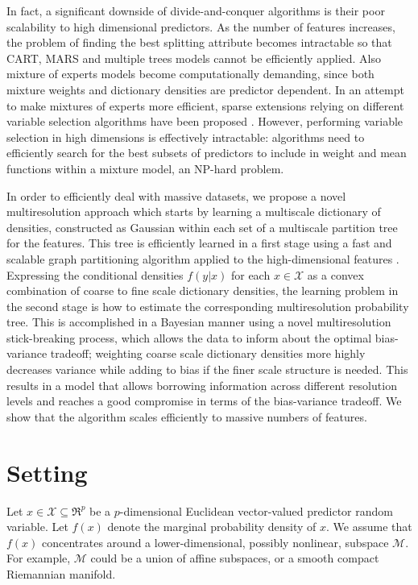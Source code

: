 \documentclass{article} %
\providecommand{\mc}[1]{\mathcal{#1}}
\begin{document}
In fact, a significant downside of divide-and-conquer algorithms is their poor scalability to high dimensional predictors. As the number of features increases, the problem of finding the best splitting attribute becomes intractable so that CART, MARS and multiple trees models cannot be efficiently applied. Also mixture of experts models become computationally demanding, since both mixture weights and dictionary densities are predictor dependent. In an attempt to make mixtures of experts more efficient, sparse extensions relying on different variable selection algorithms have been proposed \cite{SparseMoF}. However, performing variable selection in high dimensions is effectively intractable: algorithms need to efficiently search for the best subsets of predictors to include in weight and mean functions within a mixture model, an NP-hard problem.

 In order to efficiently deal with massive datasets, we propose a novel multiresolution approach which starts by learning a multiscale dictionary of densities, constructed as Gaussian within each set of a multiscale partition tree for the features. This tree is efficiently learned in a first stage using a fast and scalable graph partitioning algorithm applied to the high-dimensional features \cite{metis}.  Expressing the conditional densities $f(y|x)$ for each $x \in \mathcal{X}$ as a convex combination of coarse to fine scale dictionary densities, the learning problem in the second stage is how to estimate the corresponding multiresolution probability tree.  This is accomplished in a Bayesian manner using a novel multiresolution stick-breaking process, which allows the data to inform about the optimal bias-variance tradeoff; weighting coarse scale dictionary densities more highly decreases variance while adding to bias if the finer scale structure is needed.  This results in a model that allows borrowing information across different resolution levels and reaches a good compromise in terms of the bias-variance tradeoff. We show that the algorithm scales efficiently to massive numbers of features. 


\section{Setting} \label{section:setting}
Let $x \in \mathcal{X} \subseteq \Re^p$ be a $p$-dimensional Euclidean vector-valued predictor random variable.  Let $f(x)$ denote the marginal probability density of $x$.  We assume that $f(x)$ concentrates around a lower-dimensional, possibly nonlinear, subspace $\mc{M}$.  For example, $\mc{M}$ could be a union of affine subspaces, or a smooth compact Riemannian manifold.  
\end{document}
